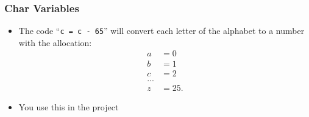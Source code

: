 \documentclass[14pt]{beamer}
\begin{document}
\begin{frame}
\frametitle{Char Variables}
\begin{itemize}
\item The code ``\texttt{c = c - 65}'' will convert each letter of the alphabet to a number with the allocation:
\begin{align*}
a&=0\\
b&=1\\
c&=2\\
 ...\\
z&=25.
\end{align*}
\pause
\vspace{-5mm}
\item You use this in the project
\end{itemize}
\end{frame}
\end{document}
